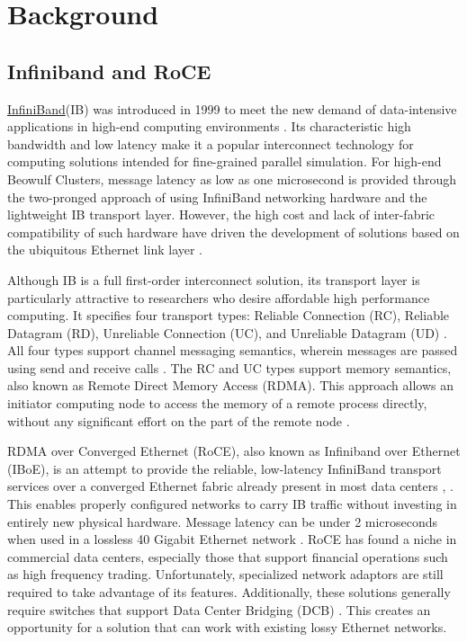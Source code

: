 \documentclass[a4paper]{article}
\begin{document}
\newpage
\section{\textbf{Background}}

\subsection{\textbf{Infiniband and RoCE}}

\href{www.infinibandta.org}{InfiniBand}\texttrademark (IB) was introduced in
1999 to meet the new demand of data-intensive applications in high-end computing
environments \cite{InfiniBandTABase-07}. Its characteristic high bandwidth and
low latency make it a popular interconnect technology for computing solutions
intended for fine-grained parallel simulation. For high-end Beowulf Clusters,
message latency as low as one microsecond is provided through the two-pronged
approach of using InfiniBand networking hardware and the lightweight IB
transport layer. However, the high cost and lack of inter-fabric compatibility
of such hardware have driven the development of solutions based on the
ubiquitous Ethernet link layer \cite{roce-announce}.

Although IB is a full first-order interconnect solution, its transport layer is
particularly attractive to researchers who desire affordable high performance
computing. It specifies four transport types: Reliable Connection (RC), Reliable
Datagram (RD), Unreliable Connection (UC), and Unreliable Datagram (UD)
\cite{InfiniBandTABase-07}. All four types support channel messaging semantics,
wherein messages are passed using send and receive calls
\cite{InfiniBandTABase-07}. The RC and UC types support memory semantics, also
known as Remote Direct Memory Access (RDMA). This approach allows an initiator
computing node to access the memory of a remote process directly, without any
significant effort on the part of the remote node \cite{sur-11}.

RDMA over Converged Ethernet (RoCE), also known as Infiniband over Ethernet
(IBoE), is an attempt to provide the reliable, low-latency InfiniBand transport
services over a converged Ethernet fabric already present in most data centers
\cite{InfiniBandTARoCE-10}, \cite{roce-announce}. This enables properly
configured networks to carry IB traffic without investing in entirely new
physical hardware. Message latency can be under 2 microseconds when used in a
lossless 40 Gigabit Ethernet network \cite{vienne-12}. RoCE has found a niche in
commercial data centers, especially those that support financial operations such
as high frequency trading. Unfortunately, specialized network adaptors are still
required to take advantage of its features. Additionally, these solutions
generally require switches that support Data Center Bridging (DCB)
\cite{InfiniBandTARoCE-10}. This creates an opportunity for a solution that can
work with existing lossy Ethernet networks.
\end{document}
